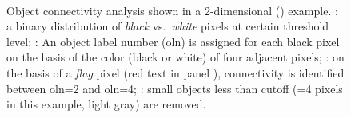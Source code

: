 \def\scale{0.5}
\begin{figure}
	\centering
	\noindent\makebox[\textwidth]{%
		\subfloat[]{%
			\label{subfig:tsuda-03a}%
		}%
		\subfloat[]{%
			\label{subfig:tsuda-03b}%
		}%
	}\\%
	\noindent\makebox[\textwidth]{%
		\subfloat[]{%
			\label{subfig:tsuda-03c}%
		}%
		\subfloat[]{%
			\label{subfig:tsuda-03d}%
		}%
	}%
	\caption[Object connectivity analysis]{Object connectivity analysis shown in a 2-dimensional (\twod) example. : a binary distribution of \emph{black} vs.\ \emph{white} pixels at certain threshold level; : An object label number (\acs{oln}) is assigned for each black pixel on the basis of the color (black or white) of four adjacent pixels; : on the basis of a \emph{flag} pixel (red text in panel ), connectivity is identified between \ac{oln}=2 and \ac{oln}=4; : small objects less than cutoff (=4 pixels in this example, light gray) are removed.}
	\label{fig:tsuda-03}
\end{figure}

